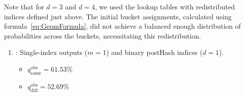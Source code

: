 Note that for \(d = 3\) and \(d = 4\), we used the lookup tables with redistributed indices defined just above. The initial bucket assignments, calculated using formula~\ref{eq:GeomFormula}, did not achieve a balanced enough distribution of probabilities across the buckets, necessitating this redistribution.
\newpage
\begin{enumerate}
    \item {}: Single-index outputs (\(m=1\)) and binary postHash indices (\(d=1\)).
    \begin{itemize}
        \item \(q_{\text{same}}^{\text{obs}} = 61.53\%\)
        \item \(q_{\text{diff}}^{\text{obs}} = 52.69\%\)
    \end{itemize}


\end{enumerate}
